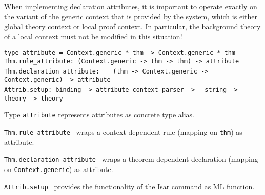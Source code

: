 \begin{isabellebody}
\begin{isamarkuptext}
  When implementing declaration attributes, it is important to operate
  exactly on the variant of the generic context that is provided by
  the system, which is either global theory context or local proof
  context.  In particular, the background theory of a local context
  must not be modified in this situation!%
\end{isamarkuptext}%
\isamarkuptrue%
%
\isadelimmlref
%
\endisadelimmlref
%
\isatagmlref
%
\begin{isamarkuptext}%
\begin{mldecls}
  \verb|type attribute = Context.generic * thm -> Context.generic * thm| \\
  \verb|Thm.rule_attribute: (Context.generic -> thm -> thm) -> attribute| \\
  \verb|Thm.declaration_attribute: |\isasep\isanewline%
\verb|  (thm -> Context.generic -> Context.generic) -> attribute| \\
  \verb|Attrib.setup: binding -> attribute context_parser ->|\isasep\isanewline%
\verb|  string -> theory -> theory| \\
  \end{mldecls}

  \begin{description}

  \item Type \verb|attribute| represents attributes as concrete
  type alias.

  \item \verb|Thm.rule_attribute|~ wraps
  a context-dependent rule (mapping on \verb|thm|) as attribute.

  \item \verb|Thm.declaration_attribute|~
  wraps a theorem-dependent declaration (mapping on \verb|Context.generic|) as attribute.

  \item \verb|Attrib.setup|~ provides
  the functionality of the Isar command \hyperlink{command.attribute-setup}{\mbox{}} as
  ML function.


\end{description}
\end{isamarkuptext}
\end{isabellebody}
